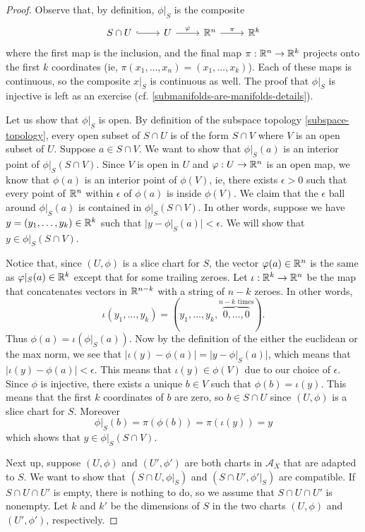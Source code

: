 \begin{proof}
	Observe that, by definition, $\phi|_S$ is the composite
	\[ \begin{tikzcd}
	S \cap U \ar[hookrightarrow]{r} & U \ar{r}{\phi} & \R^n \ar{r}{\pi} & \R^{k}
	\end{tikzcd} \]
	where the first map is the inclusion, and the final map $\pi : \mathbb{R}^n \to \mathbb{R}^{k}$ projects onto the first $k$ coordinates (ie, $\pi(x_1, \dotsc, x_n) = (x_{1}, \dotsc, x_k)$). Each of these maps is continuous, so the composite $x|_S$ is continuous as well. The proof that $\phi|_S$ is injective is left as an exercise (cf. \cref{submanifolds-are-manifolds-details}). 
	
	Let us show that $\phi|_S$ is open. By definition of the subspace topology \ref{subspace-topology}, every open subset of $S \cap U$ is of the form $S \cap V$ where $V$ is an open subset of $U$. Suppose $a \in  S \cap V$. We want to show that $\phi|_S(a)$ is an interior point of $\phi|_S(S \cap V)$. Since $V$ is open in $U$ and $\varphi : U \to \mathbb{R}^n$ is an open map, we know that $\phi(a)$ is an interior point of $\phi(V)$, ie, there exists $\epsilon > 0$ such that every point of $\mathbb{R}^n$ within $\epsilon$ of $\phi(a)$ is inside $\phi(V)$. We claim that the $\epsilon$ ball around $\phi|_S(a)$ is contained in $\phi|_S(S \cap V)$. In other words, suppose we have $y = (y_{1}, \dotsc, y_k) \in \mathbb{R}^{k}$ such that $|y - \phi|_S(a)| < \epsilon$. We will show that $y \in \phi|_S(S \cap V)$. 
	
	Notice that, since $(U,\phi)$ is a slice chart for $S$, the vector $\varphi(a) \in \mathbb{R}^n$ is the same as $\varphi|_S(a) \in \mathbb{R}^{k}$ except that for some trailing zeroes. Let $\iota : \mathbb{R}^k \to \mathbb{R}^n$ be the map that concatenates vectors in $\mathbb{R}^{n-k}$ with a string of $n-k$ zeroes. In other words, 
	\[ \iota(y_1, \dotsc, y_k) = (y_1, \dotsc, y_k, \overbrace{0, \dotsc, 0}^{n-k \text{ times}}). \]
	Thus $\phi(a) = \iota(\phi|_S(a))$. Now by the definition of the either the euclidean or the max norm, we see that $|\iota(y) - \phi(a)| = |y - \phi|_S(a)|$, which means that $|\iota(y) - \phi(a)| < \epsilon$. This means that $\iota(y) \in \phi(V)$ due to our choice of $\epsilon$. Since $\phi$ is injective, there exists a unique $b \in V$ such that $\phi(b) = \iota(y)$. This means that the first $k$ coordinates of $b$ are zero, so $b \in S \cap U$ since $(U, \phi)$ is a slice chart for $S$. Moreover
	\[ \phi|_S(b) = \pi(\phi(b)) = \pi(\iota(y)) = y \]
	which shows that $y \in \phi|_S(S \cap V)$. 
	
	Next up, suppose $(U, \phi)$ and $(U', \phi')$ are both charts in $\mathscr{A}_X$ that are adapted to $S$. We want to show that $(S \cap U, \phi|_S)$ and $(S \cap U', \phi'|_S)$ are compatible. If $S \cap U \cap U'$ is empty, there is nothing to do, so we assume that $S \cap U \cap U'$ is nonempty. Let $k$ and $k'$ be the dimensions of $S$ in the two charts $(U, \phi)$ and $(U', \phi')$, respectively. 
	

\end{proof}
